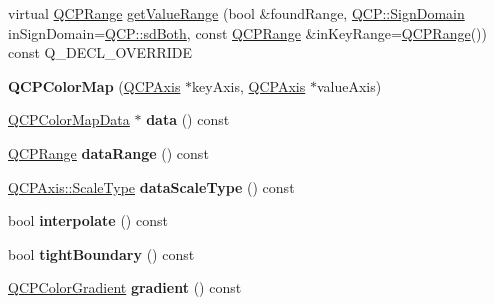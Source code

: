 \begin{DoxyCompactItemize}
\item 
virtual \hyperlink{class_q_c_p_range}{Q\+C\+P\+Range} \hyperlink{class_q_c_p_color_map_a88134493aaf6b297af34eaab65264fff}{get\+Value\+Range} (bool \&found\+Range, \hyperlink{namespace_q_c_p_afd50e7cf431af385614987d8553ff8a9}{Q\+C\+P\+::\+Sign\+Domain} in\+Sign\+Domain=\hyperlink{namespace_q_c_p_afd50e7cf431af385614987d8553ff8a9a3dee7e9cd2fedce9253b83e172626a6c}{Q\+C\+P\+::sd\+Both}, const \hyperlink{class_q_c_p_range}{Q\+C\+P\+Range} \&in\+Key\+Range=\hyperlink{class_q_c_p_range}{Q\+C\+P\+Range}()) const Q\+\_\+\+D\+E\+C\+L\+\_\+\+O\+V\+E\+R\+R\+I\+DE
\item 
{\bfseries Q\+C\+P\+Color\+Map} (\hyperlink{class_q_c_p_axis}{Q\+C\+P\+Axis} $\ast$key\+Axis, \hyperlink{class_q_c_p_axis}{Q\+C\+P\+Axis} $\ast$value\+Axis)\hypertarget{class_q_c_p_color_map_aa37e976d2ee1e2be6c4cd88a64b36215}{}\label{class_q_c_p_color_map_aa37e976d2ee1e2be6c4cd88a64b36215}

\item 
\hyperlink{class_q_c_p_color_map_data}{Q\+C\+P\+Color\+Map\+Data} $\ast$ {\bfseries data} () const \hypertarget{class_q_c_p_color_map_a7f7977e1259dd4bcbcedbdaca8bd60e9}{}\label{class_q_c_p_color_map_a7f7977e1259dd4bcbcedbdaca8bd60e9}

\item 
\hyperlink{class_q_c_p_range}{Q\+C\+P\+Range} {\bfseries data\+Range} () const \hypertarget{class_q_c_p_color_map_a37cc8e821e070697e15652f6419fab48}{}\label{class_q_c_p_color_map_a37cc8e821e070697e15652f6419fab48}

\item 
\hyperlink{class_q_c_p_axis_a36d8e8658dbaa179bf2aeb973db2d6f0}{Q\+C\+P\+Axis\+::\+Scale\+Type} {\bfseries data\+Scale\+Type} () const \hypertarget{class_q_c_p_color_map_a5ffc703dc603c4fd942f36ea51b8c48d}{}\label{class_q_c_p_color_map_a5ffc703dc603c4fd942f36ea51b8c48d}

\item 
bool {\bfseries interpolate} () const \hypertarget{class_q_c_p_color_map_a39019675a7ad00efad7212b96c0ccc95}{}\label{class_q_c_p_color_map_a39019675a7ad00efad7212b96c0ccc95}

\item 
bool {\bfseries tight\+Boundary} () const \hypertarget{class_q_c_p_color_map_aa1d9aa8db73a5942881f6f6c5afdbb0f}{}\label{class_q_c_p_color_map_aa1d9aa8db73a5942881f6f6c5afdbb0f}

\item 
\hyperlink{class_q_c_p_color_gradient}{Q\+C\+P\+Color\+Gradient} {\bfseries gradient} () const \hypertarget{class_q_c_p_color_map_a9f967a971474e32345290b79cf107809}{}\label{class_q_c_p_color_map_a9f967a971474e32345290b79cf107809}


\end{DoxyCompactItemize}
